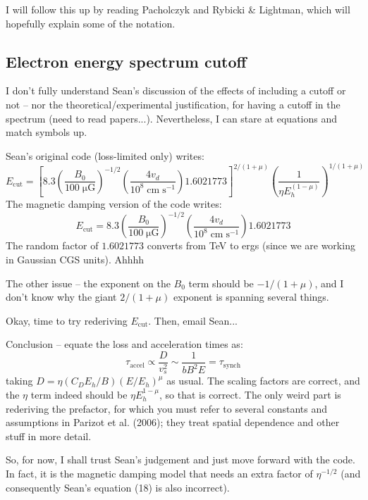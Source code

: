 \documentclass[10pt]{article}
\newcommand{\mt}{\mathrm}
\newcommand{\unit}[1]{\; \mt{#1}} %
\begin{document}
I will follow this up by reading Pacholczyk and Rybicki \& Lightman, which will
hopefully explain some of the notation.

\subsection{Electron energy spectrum cutoff}
I don't fully understand Sean's discussion of the effects of including a cutoff
or not -- nor the theoretical/experimental justification, for having a cutoff
in the spectrum (need to read papers...).  Nevertheless, I can stare at
equations and match symbols up.

Sean's original code (loss-limited only) writes:
\[
    E_{\mt{cut}} = \left[ 8.3 \left( \frac{B_0}{100 \unit{\mu G}} \right)^{-1/2}
                          \left( \frac{4 v_d}{10^8 \unit{cm\;s^{-1}}} \right)
                          1.6021773
                   \right]^{2/(1+\mu)}
                   \left( \frac{1}{\eta E_h^{(1-\mu)}} \right)^{1/(1+\mu)}
\]
The magnetic damping version of the code writes:
\[
    E_{\mt{cut}} = 8.3 \left( \frac{B_0}{100 \unit{\mu G}} \right)^{-1/2}
                   \left( \frac{4 v_d}{10^8 \unit{cm\;s^{-1}}} \right)
                   1.6021773
\]
The random factor of $1.6021773$ converts from TeV to ergs (since we are
working in Gaussian CGS units). Ahhhh

The other issue -- the exponent on the $B_0$ term should be $-1/(1+\mu)$, and I
don't know why the giant $2/(1+\mu)$ exponent is spanning several things.

Okay, time to try rederiving $E_{\mt{cut}}$.  Then, email Sean...

Conclusion -- equate the loss and acceleration times as:
\[
    \tau_{\mt{accel}} \propto \frac{D}{v_s^2}
    \sim \frac{1}{b B^2 E} = \tau_{\mt{synch}}
\]
taking $D = \eta (C_D E_h / B) (E/E_h)^\mu$ as usual.
The scaling factors are correct, and the $\eta$ term indeed
should be $\eta E_h^{1-\mu}$, so that is correct.  The only weird part is
rederiving the prefactor, for which you must refer to several constants and
assumptions in Parizot et al. (2006); they treat spatial dependence and other
stuff in more detail.

So, for now, I shall trust Sean's judgement and just move forward with the
code.  In fact, it is the magnetic damping model that needs an extra factor of
$\eta^{-1/2}$ (and consequently Sean's equation (18) is also incorrect).
\end{document}
